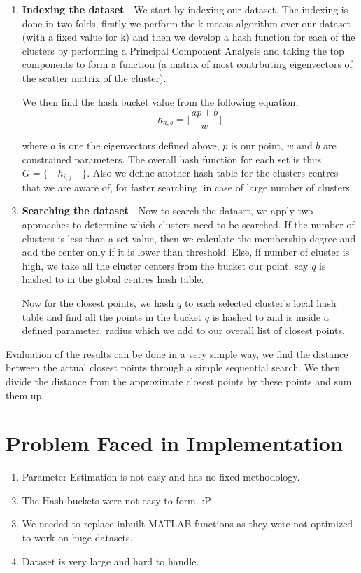 \documentclass[10pt]{extarticle}
\begin{document}
\begin{enumerate}
\item \textbf{Indexing the dataset} - We start by indexing our dataset. The indexing is done in two folds, firstly we perform the k-means algorithm over our dataset (with a fixed value for k) and then we develop a hash function for each of the clusters by performing a Principal Component Analysis and taking the top components to form a function (a matrix of most contrbuting eigenvectors of the scatter matrix of the cluster). 

We then find the hash bucket value from the following equation,
\begin{equation}
h_{a,b} = \lfloor \frac{ap + b}{w} \rfloor
\end{equation}

where $a$ is one the eigenvectors defined above, $p$ is our point, $w$ and $b$ are constrained parameters. The overall hash function for each set is thus $G = \{ \quad h_{i,j} \quad \}$. Also we define another hash table for the clusters centres that we are aware of, for faster searching, in case of large number of clusters.

\item \textbf{Searching the dataset} - Now to search the dataset, we apply two approaches to determine which clusters need to be searched. If the number of clusters is less than a set value, then we calculate the membership degree and add the center only if it is lower than threshold. Else, if number of cluster is high, we take all the cluster centers from the bucket our point. say $q$ is hashed to in the global centres hash table.

Now for the closest points, we hash $q$ to each selected cluster's local hash table and find all the points in the bucket $q$ is hashed to and is inside a defined parameter, radius which we add to our overall list of closest points. 
\end{enumerate}

Evaluation of the results can be done in a very simple way, we find the distance between the actual closest points through a simple sequential search. We then divide the distance from the approximate closest points by these points and sum them up. 

\section*{Problem Faced in Implementation}

\begin{enumerate}
\item Parameter Estimation is not easy and has no fixed methodology.
\item The Hash buckets were not easy to form. :P 
\item We needed to replace inbuilt MATLAB functions as they were not optimized to work on huge datasets.
\item Dataset is very large and hard to handle.
\end{enumerate}
\end{document}
